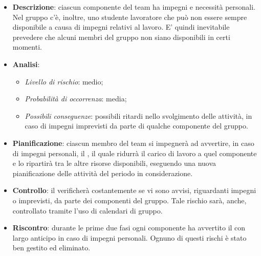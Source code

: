 			\begin{itemize}
				\item \textbf{Descrizione}: ciascun componente del team ha impegni e necessità personali. Nel gruppo c'è, inoltre, uno studente lavoratore che può non essere sempre disponibile a causa di impegni relativi al lavoro. E' quindi inevitabile prevedere che alcuni membri del gruppo non siano disponibili in certi momenti.
				\item \textbf{Analisi}:
				\begin{itemize}
					\item \textit{Livello di rischio}: medio;
					\item \textit{Probabilità di occorrenza}: media;
					\item \textit{Possibili conseguenze}: possibili ritardi nello svolgimento delle attività, in caso di impegni imprevisti da parte di qualche componente del gruppo.
				\end{itemize}
				\item \textbf{Pianificazione}: ciascun membro del team si impegnerà ad avvertire, in caso di impegni personali, il , il quale ridurrà il carico di lavoro a quel componente e lo ripartirà tra le altre risorse disponibili, eseguendo una nuova pianificazione delle attività del periodo in considerazione.
				\item \textbf{Controllo}: il  verificherà costantemente se vi sono avvisi, riguardanti impegni o imprevisti, da parte dei componenti del gruppo. Tale rischio sarà, anche, controllato tramite l'uso di calendari di gruppo.
				\item \textbf{Riscontro}: durante le prime due fasi ogni componente ha avvertito il  con largo  anticipo in caso di impegni personali. Ognuno di questi rischi è stato ben gestito ed eliminato.
			\end{itemize}

